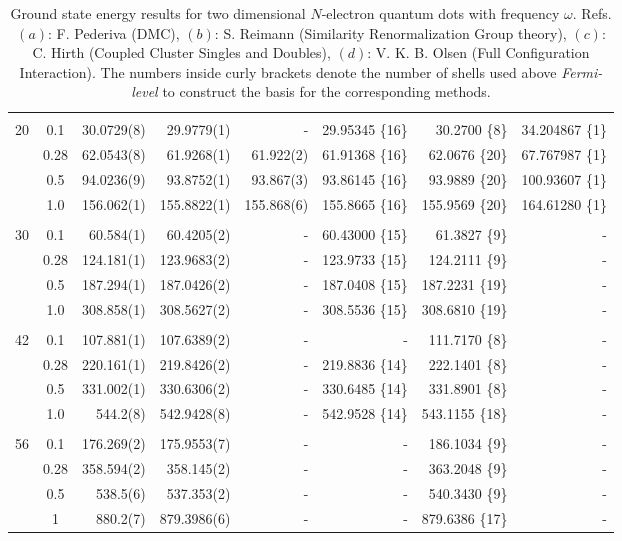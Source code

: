 \begin{table}
\begin{center}
\begin{tabular}{cc|rrrrrr}
\cline{2-8}
\multicolumn{8}{c}{} \\
    20    &   0.1    &  30.0729(8)  &  29.9779(1) & -		&29.95345 \{16\}	& 30.2700 \{8\} & 34.204867 \{1\}\\
          &   0.28   &  62.0543(8)  &  61.9268(1) & 61.922(2) &61.91368 \{16\}	& 62.0676 \{20\} & 67.767987 \{1\}\\
          &   0.5    &  94.0236(9)  &  93.8752(1) & 93.867(3) &93.86145 \{16\}	& 93.9889 \{20\} & 100.93607 \{1\}\\
          &   1.0    & 156.062(1)   & 155.8822(1) & 155.868(6)&155.8665 \{16\}	& 155.9569 \{20\}& 164.61280 \{1\}\\
\cline{2-8}
\multicolumn{8}{c}{} \\
    30    &   0.1    &  60.584(1)  &  60.4205(2)  & -		&60.43000 \{15\}	&  61.3827 \{9\}& -\\
          &   0.28   & 124.181(1)  & 123.9683(2)  & - 		&123.9733 \{15\}	& 124.2111 \{9\}& -\\
          &   0.5    & 187.294(1)  & 187.0426(2)  & - 		&187.0408 \{15\}	& 187.2231 \{19\}& -\\
          &   1.0    & 308.858(1)  & 308.5627(2)  & -	 	&308.5536 \{15\}	& 308.6810 \{19\}& -\\
\cline{2-8}
\multicolumn{8}{c}{} \\
    42    &   0.1    & 107.881(1)  & 107.6389(2)  & - 		&- 			& 111.7170 \{8\}& -\\
          &   0.28   & 220.161(1)  & 219.8426(2)  & - 		&219.8836 \{14\}	& 222.1401 \{8\}& -\\
          &   0.5    & 331.002(1)  & 330.6306(2)  & - 		&330.6485 \{14\}	& 331.8901 \{8\}& -\\
          &   1.0    & 544.2(8)    & 542.9428(8)  & - 		&542.9528 \{14\}	& 543.1155 \{18\}& -\\
\cline{2-8}
\multicolumn{8}{c}{} \\
    56    &   0.1    & 176.269(2) & 175.9553(7)   & -		& -		& 186.1034 \{9\} & -		\\
          &   0.28   & 358.594(2) & 358.145(2)    & -		& -		& 363.2048 \{9\} & -		\\
          &   0.5    & 538.5(6)   & 537.353(2)    & -		& -		& 540.3430 \{9\} & -		\\
          &   1      & 880.2(7)   & 879.3986(6)   & -		& -		& 879.6386 \{17\}& -		\\
\hline\hline


\end{tabular}
\caption{Ground state energy results for two dimensional $N$-electron quantum dots with frequency $\omega$. Refs. $(a)$: F. Pederiva \cite{MagnusArticle} (DMC), $(b)$: S. Reimann \cite{Sarah} (Similarity Renormalization Group theory), $(c)$: C. Hirth \cite{Hirth} (Coupled Cluster Singles and Doubles), $(d)$: V. K. B. Olsen \cite{Olsen} (Full Configuration Interaction). The numbers inside curly brackets denote the number of shells used above \textit{Fermi-level} to construct the basis for the corresponding methods.}
\label{tab:QDotsResultsAll}
\end{center}
\end{table}
\setlength{\tabcolsep}{6pt}


